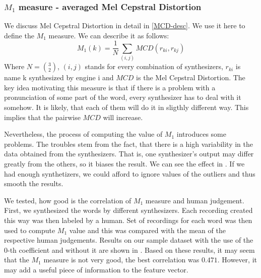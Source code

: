 \subsubsection{$M_1$ measure - averaged Mel Cepstral Distortion}
We discuss Mel Cepstral Distortion in detail in \ref{MCD-desc}. We use it here to define the $M_1$ measure. We can describe it as follows:
\begin{equation}
M_1(k) = \frac{1}{N}\sum_{(i,j)}{MCD(r_{ki},r_{kj})}
\end{equation}
Where $N = {3\choose2}$, $(i,j)$ stands for every combination of synthesizers, $r_{ki}$ is name {k} synthesized by engine {i} and $MCD$ is the Mel Cepstral Distortion.
The key idea motivating this measure is that if there is a problem with a pronunciation of some part of the word, every synthesizer has to deal with it somehow. It is likely, that each of them will do it in sligthly different way. This implies that the pairwise $MCD$ will increase.
\par
Nevertheless, the process of computing the value of $M_1$ introduces some problems. The troubles stem from the fact, that there is a high variability in the data obtained from the synthesizers. That is, one synthesizer's output may differ greatly from the others, so it biases the result. We can see the effect in . If we had enough synthetizers, we could afford to ignore values of the outliers and thus smooth the results.
\par
We tested, how good is the correlation of $M_1$ measure and human judgement. First, we synthesized the words by different synthesizers. Each recording created this way was then labeled by a human. Set of recordings for each word was then used to compute $M_1$ value and this was compared with the mean of the respective human judgements. Results on our sample dataset with the use of the $0$-th coefficient and without it are shown in . Based on these results, it may seem that the $M_1$ measure is not very good, the best correlation was $0.471$. However, it may add a useful piece of information to the feature vector.
